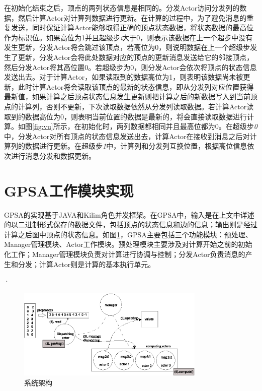 在初始化结束之后，顶点的两列状态信息是相同的。分发Actor访问分发列的数据，然后计算Actor对计算列数据进行更新。在计算的过程中，为了避免消息的重复发送，同时保证计算Actor能够取得正确的顶点状态数据，将状态数据的最高位作为标识位。如果高位为1并且超级步\textit{i}大于0，则表示该数据在上一个超步中没有发生更新，分发Actor将会跳过该顶点，若高位为0，则说明数据在上一个超级步发生了更新，分发Actor会将此处数据对应的顶点的更新消息发送给它的邻接顶点，然后分发Actor将其高位置0。若超级步为0，则分发Actor会依次将顶点的状态信息发送出去。对于计算Actor，如果读取到的数据高位为1，则表明该数据尚未被更新，此时计算Actor将会读取该顶点的最新的状态信息，即从分发列对应位置获得最新值，如果计算之后顶点状态信息发生更新则把计算之后的新数据写入到当前顶点的计算列，否则不更新，下次读取数据依然从分发列读取数据。若计算Actor读取到的数据高位为0，则表明当前位置的数据是最新的，将会直接读取数据进行计算。如图\ref{fig:vu}所示，在初始化时，两列数据都相同并且最高位都为0。在超级步\textit{0}中，分发Actor对所有顶点的状态信息发送出去，计算Actor在接收到消息之后对计算列的数据进行更新。在超级步\textit{1}中，计算列和分发列互换位置，根据高位信息依次进行消息分发和数据更新。

\section{GPSA工作模块实现}

GPSA的实现基于JAVA和Kilim角色并发框架。在GPSA中，输入是在上文中详述的以二进制形式保存的数据文件，包括顶点的状态信息和边的信息；输出则是经过计算之后图中顶点的状态信息。如图\ref{fig:overview}，GPSA主要包括三个功能模块：预处理、Manager管理模块、Actor工作模块。预处理模块主要涉及对计算开始之前的初始化工作；Manager管理模块负责对计算进行协调与控制；分发Actor负责消息的产生和分发；计算Actor则是计算的基本执行单元。

·
\begin{figure}[htbp]
\centering
\includegraphics[width=0.8\textwidth]{myfigures/newexample.eps}
\caption{系统架构}\label{fig:overview}
\vspace{\baselineskip}
\end{figure}

